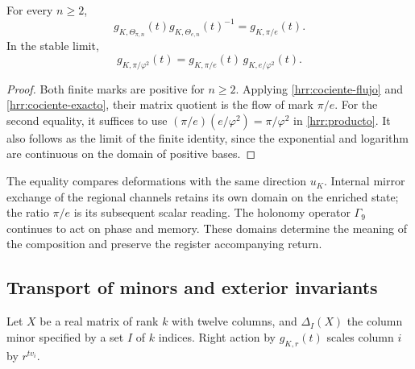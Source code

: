 \begin{corollary}
\label{hrr:composicion}
For every \(n\geq2\),
\begin{equation}
 g_{K,\Theta_{\pi,n}}(t)
 g_{K,\Theta_{e,n}}(t)^{-1}
 =g_{K,\pi/e}(t).
 \label{hrr:composicion-finita}
\end{equation}
In the stable limit,
\begin{equation}
 g_{K,\pi/\varphi^2}(t)
 =g_{K,\pi/e}(t)\,g_{K,e/\varphi^2}(t).
 \label{hrr:composicion-limite}
\end{equation}
\end{corollary}
\begin{proof}
Both finite marks are positive for \(n\geq2\). Applying \eqref{hrr:cociente-flujo} and \eqref{hrr:cociente-exacto}, their matrix quotient is the flow of mark \(\pi/e\). For the second equality, it suffices to use \((\pi/e)(e/\varphi^2)=\pi/\varphi^2\) in \eqref{hrr:producto}. It also follows as the limit of the finite identity, since the exponential and logarithm are continuous on the domain of positive bases.
\end{proof}

The equality compares deformations with the same direction \(u_K\). Internal mirror exchange of the regional channels retains its own domain on the enriched state; the ratio \(\pi/e\) is its subsequent scalar reading. The holonomy operator \(\Gamma_9\) continues to act on phase and memory. These domains determine the meaning of the composition and preserve the register accompanying return.

\subsection{Transport of minors and exterior invariants}

Let \(X\) be a real matrix of rank \(k\) with twelve columns, and \(\Delta_I(X)\) the column minor specified by a set \(I\) of \(k\) indices. Right action by \(g_{K,r}(t)\) scales column \(i\) by \(r^{tv_i}\).

